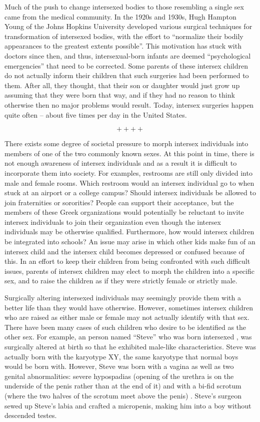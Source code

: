 	Much of the push to change intersexed bodies to those resembling a single sex came from the medical community. In the 1920s and 1930s, Hugh Hampton Young of the Johns Hopkins University developed various surgical techniques for transformation of intersexed bodies, with the effort to “normalize their bodily appearances to the greatest extents possible”. \cite{chase} This motivation has stuck with doctors since then, and thus, intersexual-born infants are deemed “psychological emergencies” that need to be corrected.  Some parents of these intersex children do not actually inform their children that such surgeries had been performed to them. After all, they thought, that their son or daughter would just grow up assuming that they were born that way, and if they had no reason to think otherwise then no major problems would result. Today, intersex surgeries happen quite often – about five times per day in the United States. \cite{libidomag}

$$++++$$

There exists some degree of societal pressure to morph intersex individuals into members of one of the two commonly known sexes. At this point in time, there is not enough awareness of intersex individuals and as a result it is difficult to incorporate them into society. For examples, restrooms are still only divided into male and female rooms. Which restroom would an intersex individual go to when stuck at an airport or a college campus? Should intersex individuals be allowed to join fraternities or sororities? People can support their acceptance, but the members of these Greek organizations would potentially be reluctant to invite intersex individuals to join their organization even though the intersex individuals may be otherwise qualified. Furthermore, how would intersex children be integrated into schools? An issue may arise in which other kids make fun of an intersex child and the intersex child becomes depressed or confused because of this. In an effort to keep their children from being confronted with such difficult issues, parents of intersex children may elect to morph the children into a specific sex, and to raise the children as if they were strictly female or strictly male.
	
Surgically altering intersexed individuals may seemingly provide them with a better life than they would have otherwise. However, sometimes intersex children who are raised as either male or female may not actually identify with that sex. There have been many cases of such children who desire to be identified as the other sex. For example, an person named “Steve” who was born intersexed  , was surgically altered at birth so that he exhibited male-like characteristics. Steve was actually born with the karyotype XY, the same karyotype that normal boys would be born with. However, Steve was born with a vagina as well as two genital abnormalities: severe hypospadias (opening of the urethra is on the underside of the penis rather than at the end of it) \cite{pubmed-hypo}and with a bi-fid scrotum (where the two halves of the scrotum meet above the penis) \cite{medscape}. Steve's surgeon sewed up Steve's labia and crafted a micropenis, making him into a boy without descended testes. \cite{libidomag}
	
